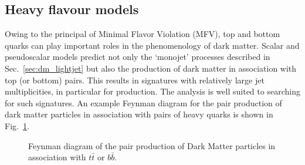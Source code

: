 



\clearpage
\subsection{Heavy flavour models} \label{sec:dm_heavyjet}

Owing to the principal of Minimal Flavor Violation (MFV), top and bottom quarks
can play important roles in the phenomenology of dark matter. Scalar and
pseudoscalar models predict not only the `monojet' processes described in
Sec.~\ref{sec:dm_lightjet} but also the production of dark matter in association
with top (or bottom) pairs. This results in signatures with relatively large jet
multiplicities, in particular for \DMtt production. The \alphat analysis is well 
suited to searching for such signatures. An example Feynman diagram for the pair
production of dark matter particles in association with pairs of heavy quarks is
shown in Fig.~\ref{fig:feynman_hf}.


\begin{figure}[h!] \centering
{}
\caption{Feynman diagram of the pair production of Dark Matter particles in
association with $t\bar{t}$ or $b\bar{b}$. \cite{Abercrombie:2015wmb}}
\label{fig:feynman_hf} \end{figure}



